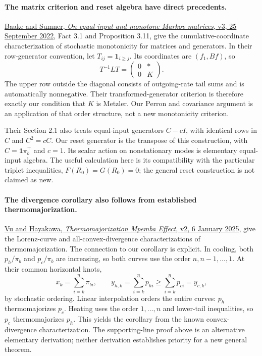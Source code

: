 \documentclass[11pt]{article}
\begin{document}
\paragraph{The matrix criterion and reset algebra have direct precedents.}
\href{https://arxiv.org/abs/2007.11433v3}{Baake and Sumner, \emph{On equal-input and monotone Markov matrices}, v3, 25 September 2022}, Fact 3.1 and Proposition 3.11, give the cumulative-coordinate characterization of stochastic monotonicity for matrices and generators. In their row-generator convention, let $T_{ij}=\mathbf1_{i\geq j}$. Its coordinates are $(f_1,Bf)$, so
\[
T^{-1}LT=\begin{pmatrix}0&*\\0&K\end{pmatrix}.
\]
The upper row outside the diagonal consists of outgoing-rate tail sums and is automatically nonnegative. Their transformed-generator criterion is therefore exactly our condition that $K$ is Metzler. Our Perron and covariance argument is an application of that order structure, not a new monotonicity criterion.

Their Section 2.1 also treats equal-input generators $C-cI$, with identical rows in $C$ and $C^2=cC$. Our reset generator is the transpose of this construction, with $C=\mathbf1\pi_b^\top$ and $c=1$. Its scalar action on nonstationary modes is elementary equal-input algebra. The useful calculation here is its compatibility with the particular triplet inequalities, $F(R_0)=G(R_0)=0$; the general reset construction is not claimed as new.

\paragraph{The divergence corollary also follows from established thermomajorization.}
\href{https://arxiv.org/html/2410.06686v2}{Vu and Hayakawa, \emph{Thermomajorization Mpemba Effect}, v2, 6 January 2025}, give the Lorenz-curve and all-convex-divergence characterizations of thermomajorization. The connection to our corollary is explicit. In cooling, both $p_h/\pi_b$ and $p_c/\pi_b$ are increasing, so both curves use the order $n,n-1,\ldots,1$. At their common horizontal knots,
\[
x_k=\sum_{i=k}^n\pi_{bi},\qquad
y_{h,k}=\sum_{i=k}^np_{hi}\geq\sum_{i=k}^np_{ci}=y_{c,k},
\]
by stochastic ordering. Linear interpolation orders the entire curves: $p_h$ thermomajorizes $p_c$. Heating uses the order $1,\ldots,n$ and lower-tail inequalities, so $p_c$ thermomajorizes $p_h$. This yields the corollary from the known convex-divergence characterization. The supporting-line proof above is an alternative elementary derivation; neither derivation establishes priority for a new general theorem.
\end{document}
